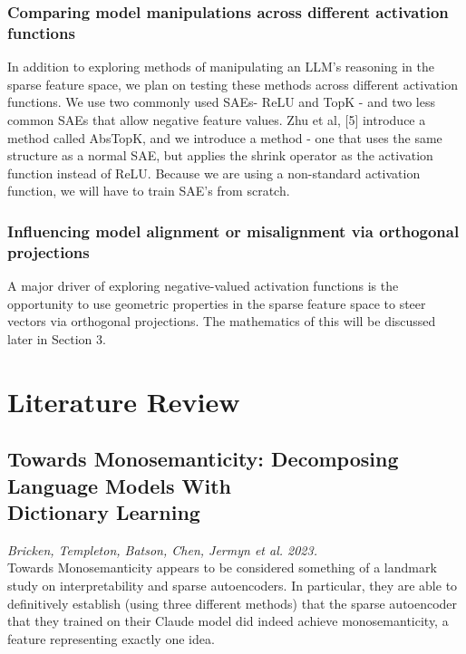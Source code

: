 \documentclass{article}
\begin{document}
\subsubsection{Comparing model manipulations across different activation functions}
    In addition to exploring methods of manipulating an LLM’s reasoning in the sparse feature space, we plan on testing these methods across different activation functions. We use two commonly used SAEs- ReLU and TopK - and two less common SAEs that allow negative feature values. Zhu et al, [5] introduce a method called AbsTopK, and we introduce a method - one that uses the same structure as a normal SAE, but applies the shrink operator as the activation function instead of ReLU. Because we are using a non-standard activation function, we will have to train SAE’s from scratch.

\subsubsection{Influencing model alignment or misalignment via orthogonal projections}
    A major driver of exploring negative-valued activation functions is the opportunity to use geometric properties in the sparse feature space to steer vectors via orthogonal projections. The mathematics of this will be discussed later in Section 3.



\section{Literature Review}
\subsection{Towards Monosemanticity: Decomposing Language Models With\\Dictionary Learning}
\textit{Bricken, Templeton, Batson, Chen, Jermyn et al. 2023.}
\cite{ggc}\\

Towards Monosemanticity appears to be considered something of a landmark study on interpretability and sparse autoencoders. In particular, they are able to definitively establish (using three different methods) that the sparse autoencoder that they trained on their Claude model did indeed achieve monosemanticity, a feature representing exactly one idea.\\
\end{document}
